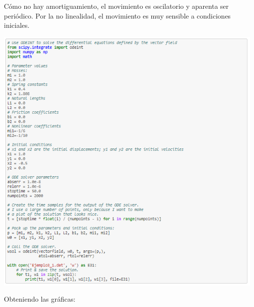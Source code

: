 \documentclass{article}
\begin{document}
Cómo no hay amortiguamiento, el movimiento es oscilatorio y aparenta ser periódico. Por la no linealidad, el movimiento es muy sensible a condiciones iniciales.
\begin{center}
    \includegraphics[width=.9\textwidth]{Datos3_1.PNG}
\end{center}
Obteniendo las gráficas:
\end{document}
